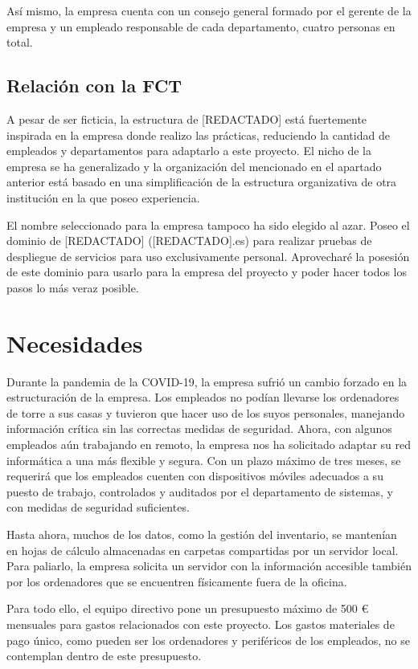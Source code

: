 Así mismo, la empresa cuenta con un consejo general formado por el gerente de la empresa y un empleado responsable de cada departamento, cuatro personas en total.
\subsection{Relación con la FCT}
A pesar de ser ficticia, la estructura de [REDACTADO] está fuertemente inspirada en la empresa donde realizo las prácticas, reduciendo la cantidad de empleados y departamentos para adaptarlo a este proyecto. El nicho de la empresa se ha generalizado y la organización del  mencionado en el apartado anterior está basado en una simplificación de la estructura organizativa de otra institución en la que poseo experiencia.

El nombre seleccionado para la empresa tampoco ha sido elegido al azar. Poseo el dominio de [REDACTADO] ([REDACTADO].es) para realizar pruebas de despliegue de servicios para uso exclusivamente personal. Aprovecharé la posesión de este dominio para usarlo para la empresa del proyecto y poder hacer todos los pasos lo más veraz posible.
\section{Necesidades}
Durante la pandemia de la COVID-19, la empresa sufrió un cambio forzado en la estructuración de la empresa. Los empleados no podían llevarse los ordenadores de torre a sus casas y tuvieron que hacer uso de los suyos personales, manejando información crítica sin las correctas medidas de seguridad. Ahora, con algunos empleados aún trabajando en remoto, la empresa nos ha solicitado adaptar su red informática a una más flexible y segura. Con un plazo máximo de tres meses, se requerirá que los empleados cuenten con dispositivos móviles adecuados a su puesto de trabajo, controlados y auditados por el departamento de sistemas, y con medidas de seguridad suficientes.

Hasta ahora, muchos de los datos, como la gestión del inventario, se mantenían en hojas de cálculo almacenadas en carpetas compartidas por un servidor local. Para paliarlo, la empresa solicita un servidor con la información accesible también por los ordenadores que se encuentren físicamente fuera de la oficina.

Para todo ello, el equipo directivo pone un presupuesto máximo de 500 € mensuales para gastos relacionados con este proyecto. Los gastos materiales de pago único, como pueden ser los ordenadores y periféricos de los empleados, no se contemplan dentro de este presupuesto.

